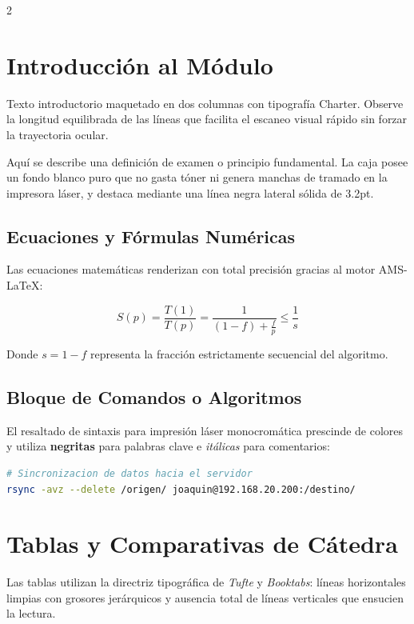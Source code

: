 \documentclass[9pt,a4paper,twoside]{extarticle}
\begin{document}
\begin{multicols*}{2}

\section{Introducción al Módulo}
Texto introductorio maquetado en dos columnas con tipografía Charter. Observe la longitud equilibrada de las líneas que facilita el escaneo visual rápido sin forzar la trayectoria ocular.

\begin{laserbox}
Aquí se describe una definición de examen o principio fundamental. La caja posee un fondo blanco puro que no gasta tóner ni genera manchas de tramado en la impresora láser, y destaca mediante una línea negra lateral sólida de 3.2pt.
\end{laserbox}

\subsection{Ecuaciones y Fórmulas Numéricas}
Las ecuaciones matemáticas renderizan con total precisión gracias al motor AMS-LaTeX:
\begin{mathbox}
$$S(p) = \frac{T(1)}{T(p)} = \frac{1}{(1-f) + \frac{f}{p}} \le \frac{1}{s}$$
\end{mathbox}
Donde $s = 1 - f$ representa la fracción estrictamente secuencial del algoritmo.

\subsection{Bloque de Comandos o Algoritmos}
El resaltado de sintaxis para impresión láser monocromática prescinde de colores y utiliza \textbf{negritas} para palabras clave e \textit{itálicas} para comentarios:

\begin{lstlisting}[style=laserstyle,language=bash]
# Sincronizacion de datos hacia el servidor
rsync -avz --delete /origen/ joaquin@192.168.20.200:/destino/
\end{lstlisting}

\section{Tablas y Comparativas de Cátedra}
Las tablas utilizan la directriz tipográfica de \textit{Tufte} y \textit{Booktabs}: líneas horizontales limpias con grosores jerárquicos y ausencia total de líneas verticales que ensucien la lectura.


\end{multicols*}
\end{document}
